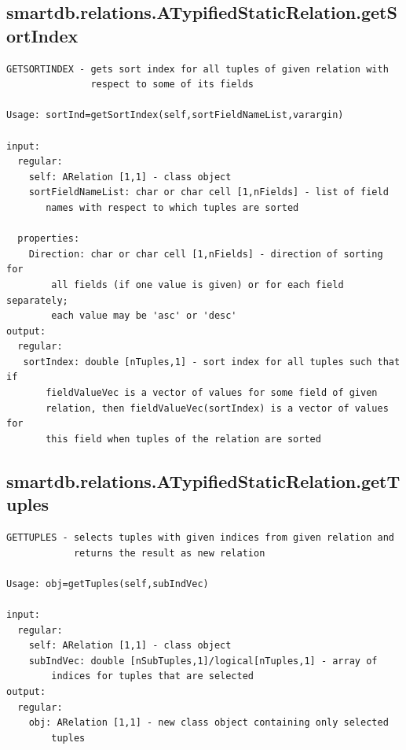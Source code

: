 \documentclass[letterpaper,10pt,english]{sphinxmanual}
\begin{document}
\subsection{smartdb.relations.ATypifiedStaticRelation.getSortIndex}
\label{chap_functions:smartdb-relations-atypifiedstaticrelation-getsortindex}
\begin{Verbatim}[commandchars=\\\{\}]
GETSORTINDEX - gets sort index for all tuples of given relation with
               respect to some of its fields

Usage: sortInd=getSortIndex(self,sortFieldNameList,varargin)

input:
  regular:
    self: ARelation [1,1] - class object
    sortFieldNameList: char or char cell [1,nFields] - list of field
       names with respect to which tuples are sorted

  properties:
    Direction: char or char cell [1,nFields] - direction of sorting for
        all fields (if one value is given) or for each field separately;
        each value may be 'asc' or 'desc'
output:
  regular:
   sortIndex: double [nTuples,1] - sort index for all tuples such that if
       fieldValueVec is a vector of values for some field of given
       relation, then fieldValueVec(sortIndex) is a vector of values for
       this field when tuples of the relation are sorted
\end{Verbatim}


\subsection{smartdb.relations.ATypifiedStaticRelation.getTuples}
\label{chap_functions:smartdb-relations-atypifiedstaticrelation-gettuples}
\begin{Verbatim}[commandchars=\\\{\}]
GETTUPLES - selects tuples with given indices from given relation and
            returns the result as new relation

Usage: obj=getTuples(self,subIndVec)

input:
  regular:
    self: ARelation [1,1] - class object
    subIndVec: double [nSubTuples,1]/logical[nTuples,1] - array of
        indices for tuples that are selected
output:
  regular:
    obj: ARelation [1,1] - new class object containing only selected
        tuples
\end{Verbatim}
\end{document}

